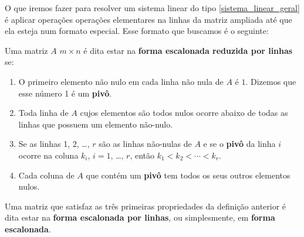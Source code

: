 O que iremos fazer para resolver um sistema linear do tipo \eqref{sistema_linear_geral} é aplicar operações operações elementares na linhas da matriz ampliada até que ela esteja num formato especial. Esse formato que buscamos é o seguinte:

\begin{definicao}\label{linhareduzida}
    Uma matriz $A$ $m \times n$ \'e  dita estar na \textbf{forma escalonada reduzida por linhas} se:
    \begin{enumerate}[label={\roman*})]
        \item O primeiro elemento n\~ao nulo em cada linha n\~ao nula de $A$ \'e $1$. Dizemos que esse número 1 é um \textbf{pivô}.

        \item Toda linha de $A$ cujos elementos s\~ao todos nulos ocorre abaixo de todas as linhas que possuem um elemento n\~ao-nulo. 

        \item Se as linhas 1, 2, \dots, $r$ s\~ao as linhas n\~ao-nulas de $A$ e se o \textbf{pivô} da linha $i$ ocorre na coluna $k_i$, $i = 1$, \dots, $r$, ent\~ao $k_1 < k_2 < \cdots < k_r$.

        \item Cada coluna de $A$ que cont\'em um \textbf{pivô} tem todos os seus outros elementos nulos.
    \end{enumerate}
\end{definicao}

\begin{observacao}
    Uma matriz que satisfaz as três primeiras propriedades da definição anterior é dita estar na \textbf{forma escalonada por linhas}, ou simplesmente, em \textbf{forma escalonada}.
\end{observacao}

